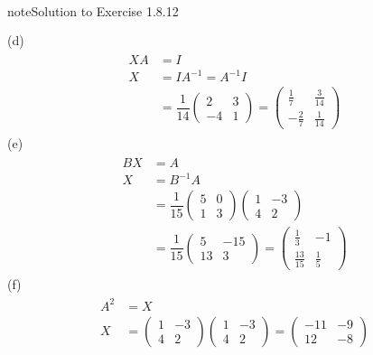 \documentclass[letterpaper,10pt,english]{jupyterBook}
\begin{document}
\begin{sphinxadmonition}{note}{Solution to Exercise 1.8.12}
\begin{equation*}
\begin{split}
\begin{align*}
\end{align*} \end{split}
\end{equation*}
\sphinxAtStartPar
(d)
\begin{equation*}
\begin{split} \begin{align*}
    XA &= I \\
    X &= IA^{-1} = A^{-1}I \\
    &= \dfrac{1}{14} \begin{pmatrix} 2 & 3 \\ -4 & 1 \end{pmatrix} = \begin{pmatrix} \frac{1}{7} & \frac{3}{14} \\ -\frac{2}{7} & \frac{1}{14} \end{pmatrix}
\end{align*} \end{split}
\end{equation*}
\sphinxAtStartPar
(e)
\begin{equation*}
\begin{split} \begin{align*}
    BX &= A \\
    X &= B^{-1}A \\
    &= \dfrac{1}{15}\begin{pmatrix} 5 & 0 \\ 1 & 3 \end{pmatrix} \begin{pmatrix} 1 & -3 \\ 4 & 2 \end{pmatrix} \\
    &= \dfrac{1}{15} \begin{pmatrix} 5 & -15 \\ 13 & 3\end{pmatrix} = \begin{pmatrix} \frac{1}{3} & -1 \\ \frac{13}{15} & \frac{1}{5} \end{pmatrix}
\end{align*} \end{split}
\end{equation*}
\sphinxAtStartPar
(f)
\begin{equation*}
\begin{split} \begin{align*}
    A^2 &= X \\
    X &= \begin{pmatrix} 1 & -3 \\ 4 & 2 \end{pmatrix}\begin{pmatrix} 1 & -3 \\ 4 & 2 \end{pmatrix} = \begin{pmatrix} -11 & -9 \\ 12 & -8 \end{pmatrix}

\end{align*}
\end{split}
\end{equation*}
\end{sphinxadmonition}
\end{document}

